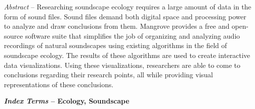\begin{flushleft}
  \setlength{\parindent}{0.125in}
  {
    {\indent\fontsize{9}{11}\bfseries
      \par\textit{Abstract}  -- Researching soundscape ecology requires a large amount of data in the form of sound files. Sound files demand both digital space and processing power to analyze and draw conclusions from them. Mangrove provides a free and open-source software suite that simplifies the job of organizing and analyzing audio recordings of natural soundscapes using existing algorithms in the field of soundscape ecology. The results of these algorithms are used to create interactive data visualizations. Using these visualizations, researchers are able to come to conclusions regarding their research points, all while providing visual representations of these conclusions.
    }
    \par{\fontsize{9}{11}\bfseries
      \textit{Index Terms}  -- Ecology, Soundscape
    }
  }
\end{flushleft}
